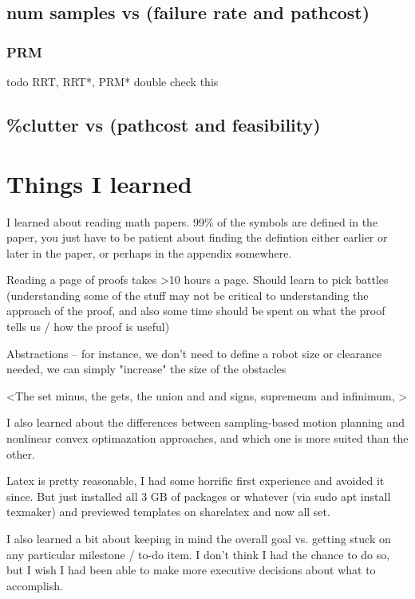 \documentclass[a4paper]{article}
\begin{document}
{    \subsection{num samples vs (failure rate and pathcost)}
    \subsubsection{PRM}

    todo RRT, RRT*, PRM* double check this

    \subsection{\%clutter vs (pathcost and feasibility)}




\section{Things I learned}

I learned about reading math papers. 99\% of the symbols are defined in the
paper, you just have to be patient about finding the defintion either earlier or later in
the paper, or perhaps in the appendix somewhere. 

    Reading a page of proofs takes >10 hours a page. Should learn to pick
    battles (understanding some of the stuff may not be critical to
    understanding the approach of the proof, and also some time should be spent
    on what the proof tells us / how the proof is useful)

    Abstractions -- for instance, we don't need to define a robot size or
    clearance needed, we can
    simply "increase" the size of the obstacles

<The set minus, the gets, the union and and signs, supremeum and infinimum, >


I also learned about the differences between sampling-based motion planning and
nonlinear convex optimazation approaches, and which one is more suited than the
other.

Latex is pretty reasonable, I had some horrific first experience and avoided it
    since. But just installed all 3 GB of packages or whatever (via sudo apt
    install texmaker) and previewed templates on sharelatex and now all set.

I also learned a bit about keeping in mind the overall goal vs. getting stuck on
any particular milestone / to-do item. I don't think I had the chance to do so,
but I wish I had been able to make more executive decisions about what to
accomplish. 

}
\end{document}
